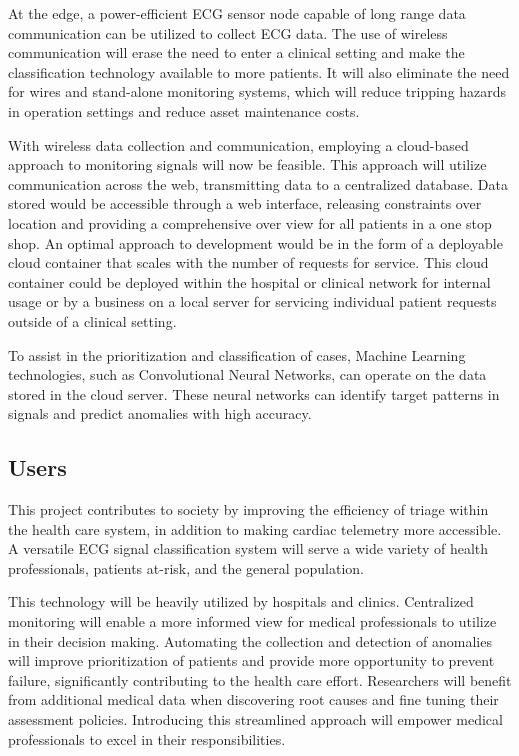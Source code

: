 \documentclass{article}
\begin{document}
At the edge, a power-efficient ECG sensor node capable of long range data communication can be utilized to collect ECG data. The use of wireless communication will erase the need to enter a clinical setting and make the classification technology available to more patients. It will also eliminate the need for wires and stand-alone monitoring systems, which will reduce tripping hazards in operation settings and reduce asset maintenance costs. 

With wireless data collection and communication, employing a cloud-based approach to monitoring signals will now be feasible. This approach will utilize communication across the web, transmitting data to a centralized database. Data stored would be accessible through a web interface, releasing constraints over location  and providing a comprehensive over view for all patients in a one stop shop. An optimal approach to development would be in the form of a deployable cloud container that scales with the number of requests for service. This cloud container could be deployed within the hospital or clinical network for internal usage or by a business on a local server for servicing individual patient requests outside of a clinical setting.

To assist in the prioritization and classification of cases, Machine Learning technologies, such as Convolutional Neural Networks, can operate on the data stored in the cloud server. These neural networks can identify target patterns in signals and predict anomalies with high accuracy. 
\subsection{Users}
This project contributes to society by improving the efficiency of triage within the health care system, in addition to making cardiac telemetry more accessible. A versatile ECG signal classification system will serve a wide variety of health professionals, patients at-risk, and the general population.

This technology will be heavily utilized by hospitals and clinics. Centralized monitoring will enable a more informed view for medical professionals to utilize in their decision making. Automating the collection and detection of anomalies will improve prioritization of patients and provide more opportunity to prevent failure, significantly contributing to the health care effort. Researchers will benefit from additional medical data when discovering root causes and fine tuning their assessment policies. Introducing this streamlined approach will empower medical professionals to excel in their responsibilities.
\end{document}
